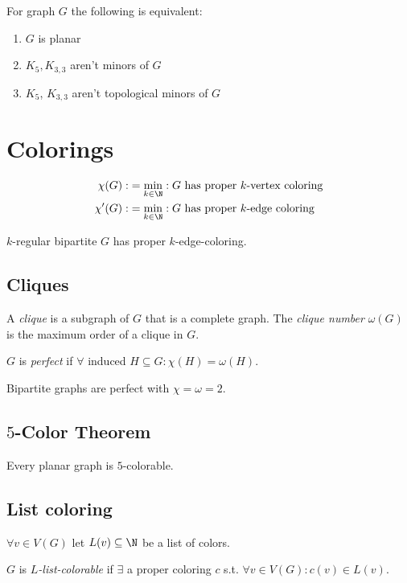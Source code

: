 For graph $G$ the following is equivalent:

\begin{enumerate}[label=(\alph*)]
	\item $G$ is planar
	\item $K_5, K_{3,3}$ aren't minors of $G$
	\item $K_5$, $K_{3,3}$ aren't topological minors of $G$
\end{enumerate}


\section*{Colorings}

\vspace*{-4mm}
\begin{align*}
\chi(G) :&= \min_{k \in \N} : G \text{ has proper $k$-vertex coloring} \\
\chi'(G) :&= \min_{k \in \N} : G \text{ has proper $k$-edge coloring}
\end{align*}

$k$-regular bipartite $G$ has proper $k$-edge-coloring.

\subsection*{Cliques}

A \emph{clique} is a subgraph of $G$ that is a complete graph.
The \emph{clique number} $\omega(G)$ is the maximum order of a clique in $G$.

\spacing

$G$ is \emph{perfect} if $\forall$ induced $H \subseteq G : \chi(H) = \omega(H)$.

Bipartite graphs are perfect with $\chi = \omega = 2$.

\subsection*{$5$-Color Theorem}

Every planar graph is $5$-colorable.

\subsection*{List coloring}

$\forall v \in V(G)$ let $L(v) \subseteq \N$ be a list of colors.

$G$ is \emph{$L$-list-colorable} if $\exists$ a proper coloring $c$ s.t. $\forall v \in V(G) : c(v) \in L(v)$.

